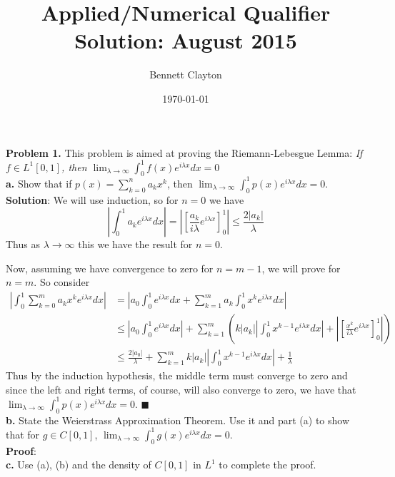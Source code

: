 \documentclass[11pt]{article}
\title{Applied/Numerical Qualifier Solution: August 2015}
\author{Bennett Clayton}
\affil{Texas A\&M University}
\date{\today}
\begin{document}
\maketitle

{\bf Problem 1.} This problem is aimed at proving the Riemann-Lebesgue Lemma: {\it If $f\in L^1[0,1]$, then $\lim_{\lambda \to \infty} \int_0^1 f(x)e^{i\lambda x} dx = 0$}
\\[4pt]

{\bf a.} Show that if $p(x) = \sum_{k=0}^n a_kx^k$, then $\lim_{\lambda \to \infty} \int_0^1 p(x)e^{i\lambda x} dx = 0$.
\\[8pt]

{\bf Solution}: We will use induction, so for $n = 0$ we have 
\[ \left|\int_0^1 a_k e^{i\lambda x} dx\right| = \left|\left[\frac{a_k}{i\lambda}e^{i\lambda x} \right]_0^1\right| \leq  \frac{2|a_k|}{\lambda}  \]
Thus as $\lambda \to \infty$ this we have the result for $n=0$. 

Now, assuming we have convergence to zero for $n = m-1$, we will prove for $n = m$. So consider 
\begin{align*}
\left| \int_0^1 \sum_{k=0}^m a_kx^ke^{i\lambda x} dx \right| &= \left| a_0\int_0^1e^{i\lambda x} dx + \sum_{k=1}^m a_k\int_0^1 x^ke^{i\lambda x} dx \right| \\
&\leq \left|a_0\int_0^1 e^{i\lambda x} dx\right| + \sum_{k=1}^m \left( k|a_k| \left|\int_0^1 x^{k-1}e^{i\lambda x} dx\right| + \left|\left[ \frac{x^k}{i\lambda}e^{i\lambda x} \right]_0^1\right| \right) \\
&\leq \frac{2|a_0|}{\lambda} + \sum_{k=1}^m k|a_k| \left|\int_0^1 x^{k-1}e^{i\lambda x} dx\right| + \frac{1}{\lambda}
\end{align*}
Thus by the induction hypothesis, the middle term must converge to zero and since the left and right terms, of course, will also converge to zero, we have that $\lim_{\lambda \to \infty} \int_0^1 p(x)e^{i\lambda x} dx = 0$. $\blacksquare$
\\[16pt]



{\bf b.} State the Weierstrass Approximation Theorem. Use it and part (a) to show that for $g\in C[0,1]$, $\lim_{\lambda\to\infty} \int_0^1 g(x) e^{i\lambda x} dx = 0$.
\\[8pt]

{\bf Proof}: 
\\[16pt]




{\bf c.} Use (a), (b) and the density of $C[0,1]$ in $L^1$ to complete the proof.
\\[8pt]
\end{document}
